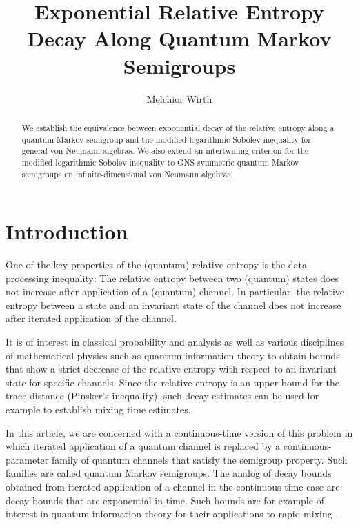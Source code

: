 \documentclass[12pt,a4paper]{amsart}
\title[Logarithmic Sobolev Inequalities]{Exponential Relative Entropy Decay Along Quantum Markov Semigroups}
\author{Melchior Wirth}
\newcommand{\1}{\mathds{1}}
\theoremstyle{plain}
\theoremstyle{definition}
\theoremstyle{remark}
\begin{document}
\begin{abstract}
    We establish the equivalence between exponential decay of the relative entropy along a quantum Markov semigroup and the modified logarithmic Sobolev inequality for general von Neumann algebras. We also extend an intertwining criterion for the modified logarithmic Sobolev inequality to GNS-symmetric quantum Markov semigroups on infinite-dimensional von Neumann algebras.
\end{abstract}

\maketitle

\section*{Introduction}

One of the key properties of the (quantum) relative entropy is the data processing inequality: The relative entropy between two (quantum) states does not increase after application of a (quantum) channel. In particular, the relative entropy between a state and an invariant state of the channel does not increase after iterated application of the channel.

It is of interest in classical probability and analysis as well as various disciplines of mathematical physics such as quantum information theory to obtain bounds that show a strict decrease of the relative entropy with respect to an invariant state for specific channels. Since the relative entropy is an upper bound for the trace distance (Pinsker's inequality), such decay estimates can be used for example to establish mixing time estimates.

In this article, we are concerned with a continuous-time version of this problem in which iterated application of a quantum channel is replaced by a continuous-parameter family of quantum channels that satisfy the semigroup property. Such families are called quantum Markov semigroups. The analog of decay bounds obtained from iterated application of a channel in the continuous-time case are decay bounds that are exponential in time. Such bounds are for example of interest in quantum information theory for their applications to rapid mixing \cite{KT13,Bar17}.
\end{document}
